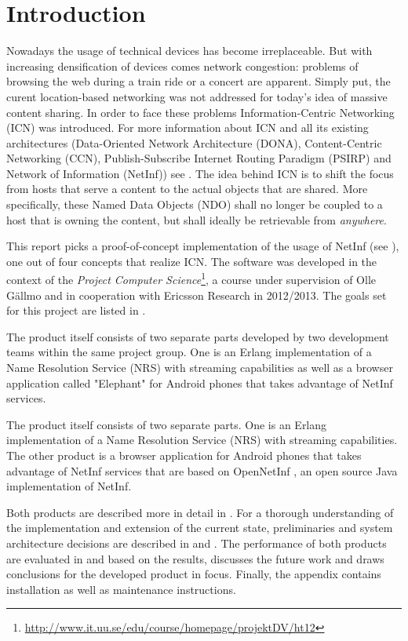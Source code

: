 \chapter{Introduction}

Nowadays the usage of technical devices has become irreplaceable. But with increasing
densification of devices comes network congestion: problems of
browsing the web during a train ride or a concert are apparent. Simply put, the curent
location-based networking was not addressed for today's idea of massive content sharing. 
In order to face these problems Information-Centric Networking (ICN) was introduced. For
more information about ICN and all its existing architectures (Data-Oriented Network Architecture (DONA),
Content-Centric Networking (CCN), Publish-Subscribe Internet Routing Paradigm (PSIRP) and Network of Information (NetInf)) 
see \cite{netinf}.
The idea behind ICN is to shift the focus from hosts that serve a content to the actual objects that
are shared. More specifically, these Named Data Objects (NDO) shall no longer be coupled
to a host that is owning the content, but shall ideally be retrievable from \textit{anywhere}.

This report picks a proof-of-concept implementation of the usage of NetInf
(see ), one out of four concepts that realize ICN. The software was
developed in the context of the 
\textit{Project Computer Science}\footnote{\url{http://www.it.uu.se/edu/course/homepage/projektDV/ht12}},
a course under supervision of Olle G\"{a}llmo and in cooperation with Ericsson Research \cite{ericsson}
in 2012/2013. The goals set for this project are listed in . 

The product itself consists of two separate parts developed by two development teams within the same project group. One is an Erlang implementation of a Name Resolution Service (NRS) with streaming capabilities
as well as a browser application called "Elephant" for Android phones that takes advantage of NetInf services. 

The product itself consists of two separate parts. One is an Erlang \cite{erlang} implementation of a Name Resolution Service (NRS) with streaming capabilities.
The other product is a browser application for Android \cite{android}  phones that takes advantage of NetInf services that
are based on OpenNetInf \cite{opennetinf}, an open source Java implementation of NetInf. 

Both products are described more in detail in . For a thorough understanding
of the implementation and extension of the current state, preliminaries and system architecture decisions are 
described in  and . 
The performance of both products are evaluated in  and based on the results,
 discusses the future work and draws conclusions for the developed product
in focus. Finally, the appendix contains installation as well as maintenance instructions.

